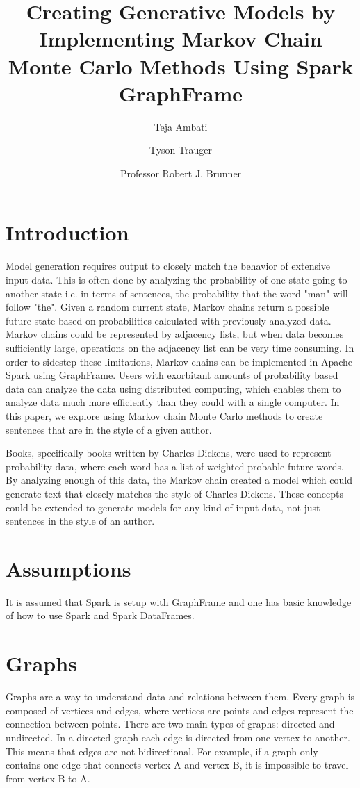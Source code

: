 \documentclass[9pt,twocolumn,twoside]{idsi}
\title{Creating Generative Models by Implementing Markov Chain Monte Carlo Methods Using Spark GraphFrame}
\author[1]{Teja Ambati}
\author[1]{Tyson Trauger}
\author[1, 2]{Professor Robert J. Brunner}
\affil[1]{University of Illinois at Urbana-Champaign}
\affil[2]{Laboratory for Computation, Data, and Machine Learning}
\begin{document}
\maketitle
\section{Introduction}

Model generation requires output to closely match the behavior of extensive input data. This is often done by analyzing the probability of one state going to another state i.e. in terms of sentences, the probability that the word "man" will follow "the". Given a random current state, Markov chains return a possible future state based on probabilities calculated with previously analyzed data. Markov chains could be represented by adjacency lists, but when data becomes sufficiently large, operations on the adjacency list can be very time consuming. In order to sidestep these limitations, Markov chains can be implemented in Apache Spark using GraphFrame. Users with exorbitant amounts of probability based data can analyze the data using distributed computing, which enables them to analyze data much more efficiently than they could with a single computer. In this paper, we explore using Markov chain Monte Carlo methods to create sentences that are in the style of a given author. 

Books, specifically books written by Charles Dickens, were used to represent probability data, where each word has a list of weighted probable future words. By analyzing enough of this data, the Markov chain created a model which could generate text that closely matches the style of Charles Dickens. These concepts could be extended to generate models for any kind of input data, not just sentences in the style of an author. 


\section{Assumptions}
It is assumed that Spark is setup with GraphFrame and one has basic knowledge of how to use Spark and Spark DataFrames.

\section{Graphs}\label{sec:graphs}
Graphs are a way to understand data and relations between them. Every graph is composed of vertices and edges, where vertices are points and edges represent the connection between points. There are two main types of graphs: directed and undirected. In a directed graph each edge is directed from one vertex to another. This means that edges are not bidirectional. For example, if a graph only contains one edge that connects vertex A and vertex B, it is impossible to travel from vertex B to A. \linebreak
 
\end{document}

